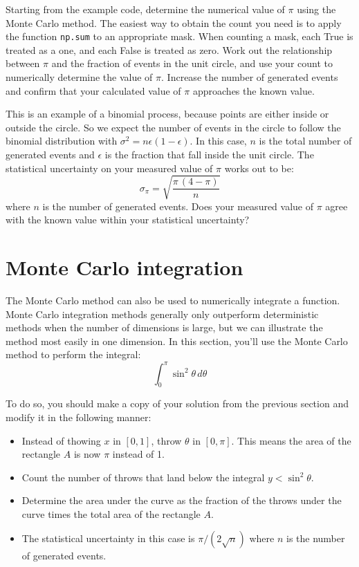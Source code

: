 \begin{plot} \end{plot}
Starting from the example code, determine the numerical value of $\pi$
using the Monte Carlo method.  The easiest way to obtain the count you
need is to apply the function {\tt np.sum} to an appropriate mask.
When counting a mask, each True is treated as a one, and each False is
treated as zero.  Work out the relationship between $\pi$ and the
fraction of events in the unit circle, and use your count to
numerically determine the value of $\pi$.  Increase the number of
generated events and confirm that your calculated value of $\pi$
approaches the known value.

\begin{plot} \end{plot}
This is an example of a binomial process, because points are either
inside or outside the circle. So we expect the number of events in the
circle to follow the binomial distribution with $\sigma^2 = n \epsilon
(1-\epsilon)$.  In this case, $n$ is the total number of generated
events and $\epsilon$ is the fraction that fall inside the unit
circle.  The statistical uncertainty on your measured value of $\pi$
works out to be:
\begin{displaymath}
\sigma_\pi = \sqrt{\frac{\pi \, (4-\pi)}{n}}
\end{displaymath}
where $n$ is the number of generated events.  Does your measured value
of $\pi$ agree with the known value within your statistical
uncertainty?

\section{Monte Carlo integration}

The Monte Carlo method can also be used to numerically integrate a
function.  Monte Carlo integration methods generally only outperform
deterministic methods when the number of dimensions is large, but we
can illustrate the method most easily in one dimension. In this
section, you'll use the Monte Carlo method to perform the integral:
\begin{displaymath}
  \int_0^\pi \sin^2 \theta \, d\theta
\end{displaymath}

To do so, you should make a copy of your solution from the previous section
and modify it in the following manner:
\begin{itemize}
 \item Instead of thowing $x$ in $[0,1]$, throw $\theta$ in $[0,\pi]$.  This means the area of the rectangle $A$ is now $\pi$ instead of 1.
 \item Count the number of throws that land below the integral $y < \sin^2 \theta$.
 \item Determine the area under the curve as the fraction of the throws under the curve times the total area of the rectangle $A$.
 \item The statistical uncertainty in this case is $\pi/(2\sqrt{n})$ where $n$ is the number of generated events.
\end{itemize}  

